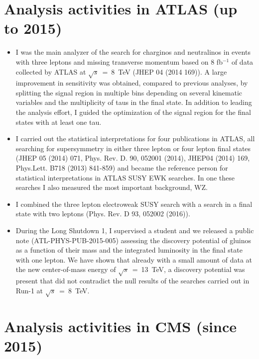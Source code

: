 \documentclass[]{cv} %
\begin{document}
\ifresume
\begin{resume}

\section{Analysis activities in ATLAS (up to 2015)}

\begin{itemize}
  \item I was the main analyzer of the search for charginos and neutralinos in
        events with three leptons and missing transverse momentum based on 8 fb$^{-1}$
        of data collected by ATLAS at $\sqrt{s}$~=~8~TeV (JHEP 04 (2014 169)). A large
        improvement in sensitivity was obtained, compared to previous analyses, by
        splitting the signal region in multiple bins depending on several kinematic
        variables and the multiplicity of taus in the final state. In addition to
        leading the analysis effort, I guided the optimization of the signal region
        for the final states with at least one tau.
  \item I carried out the statistical interpretations for four publications in
        ATLAS, all searching for supersymmetry in either three lepton or four lepton
        final states (JHEP 05 (2014) 071, Phys. Rev. D. 90, 052001 (2014),
        JHEP04 (2014) 169, Phys.Lett. B718 (2013) 841-859) and became the reference
        person for statistical interpretations in ATLAS SUSY EWK searches. In
        one these searches I also measured the most important background, WZ.
  \item I combined the three lepton electroweak SUSY search with a search in a
        final state with two leptons (Phys. Rev. D 93, 052002 (2016)).
  \item During the Long Shutdown 1, I supervised a student and we released a
        public note (ATL-PHYS-PUB-2015-005) assessing the discovery potential of
        gluinos as a function of their mass and the integrated luminosity in the
        final state with one lepton. We have shown that already with a small
        amount of data at the new center-of-mass energy of $\sqrt{s}$~=~13~TeV,
        a discovery potential was present that did not contradict the null
        results of the searches carried out in Run-1 at $\sqrt{s}$~=~8~TeV.
\end{itemize}

\vspace{12pt}
\section{Analysis activities in CMS (since 2015)}


\end{resume}
\end{document}
